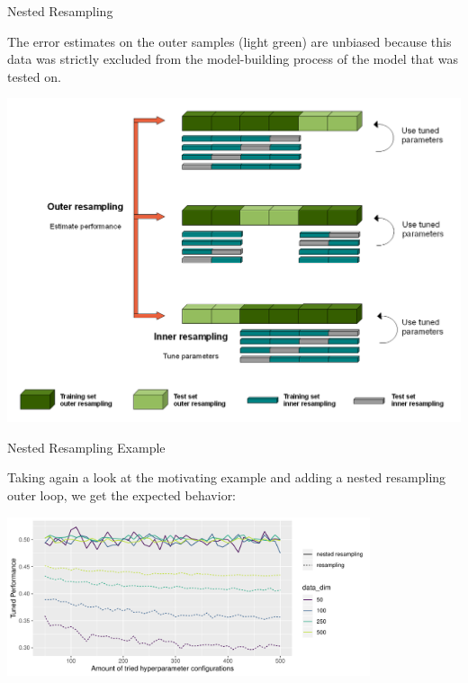 \begin{frame}[c,allowframebreaks]{Nested Resampling}
    \framebreak

    \begin{footnotesize}
    The error estimates on the outer samples (light green) are unbiased because this data was strictly excluded from the model-building process of the model that was tested on.
    \end{footnotesize}

    \begin{center}
        \includegraphics[height=0.6\textheight]{Nested_Resampling.png}
    \end{center}

    \end{frame}


    \begin{frame}[c]{Nested Resampling Example}

    Taking again a look at the motivating example and adding a nested resampling outer loop, we get the expected behavior:

    \begin{center}
        \includegraphics[width=0.8\textwidth]{nested-resampling-example}
    \end{center}


    \end{frame}


